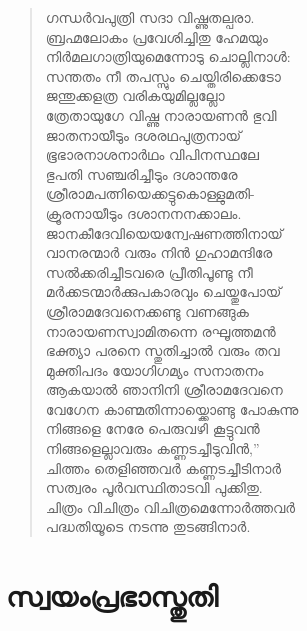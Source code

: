 \begin{verse}
ഗന്ധര്‍വപുത്രി സദാ വിഷ്ണുതല്പരാ.\\
ബ്രഹ്മലോകം പ്രവേശിച്ചിതു ഹേമയും\\
നിര്‍മലഗാത്രിയുമെന്നോടു ചൊല്ലിനാള്‍:\\
സന്തതം നീ തപസ്സും ചെയ്തിരിക്കെടോ\\
ജന്തുക്കളത്ര വരികയുമില്ലല്ലോ\\
ത്രേതായുഗേ വിഷ്ണു നാരായണന്‍ ഭുവി\\
ജാതനായീടും ദശരഥപുത്രനായ്\\
ഭൂഭാരനാശനാര്‍ഥം വിപിനസ്ഥലേ\\
ഭുപതി സഞ്ചരിച്ചീടും ദശാന്തരേ\\
ശ്രീരാമപത്നിയെക്കട്ടുകൊള്ളുമതി-\\
ക്രൂരനായീടും ദശാനനനക്കാലം.\\
ജാനകീദേവിയെയന്വേഷണത്തിനായ്\\
വാനരന്മാര്‍ വരും നിന്‍ ഗുഹാമന്ദിരേ\\
സല്‍ക്കരിച്ചീടവരെ പ്രീതിപൂണ്ടു നീ\\
മര്‍ക്കടന്മാര്‍ക്കുപകാരവും ചെയ്തുപോയ്\\
ശ്രീരാമദേവനെക്കണ്ടു വണങ്ങുക\\
നാരായണസ്വാമിതന്നെ രഘൂത്തമന്‍\\
ഭക്ത്യാ പരനെ സ്തുതിച്ചാല്‍ വരും തവ\\
മുക്തിപദം യോഗിഗമ്യം സനാതനം\\
ആകയാല്‍ ഞാനിനി ശ്രീരാമദേവനെ\\
വേഗേന കാണ്മതിന്നായ്ക്കൊണ്ടു പോകുന്നു\\
നിങ്ങളെ നേരേ പെരുവഴി കൂട്ടുവന്‍\\
നിങ്ങളെല്ലാവരും കണ്ണടച്ചീടുവിന്‍,”\\
ചിത്തം തെളിഞ്ഞവര്‍ കണ്ണടച്ചീടിനാര്‍\\
സത്വരം പൂര്‍വസ്ഥിതാടവി പുക്കിതു.\\
ചിത്രം വിചിത്രം വിചിത്രമെന്നോര്‍ത്തവര്‍\\
പദ്ധതിയൂടെ നടന്നു തുടങ്ങിനാര്‍.
\end{verse}


\section{സ്വയംപ്രഭാസ്തുതി}

